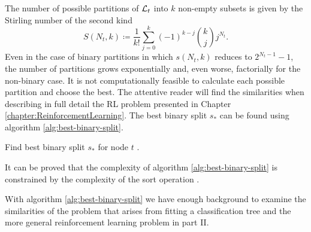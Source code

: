 The number of possible partitions of $\mathcal{L}_t$ into $k$ non-empty subsets is given by the Stirling number of the second kind \cite{louppe2014}
\begin{equation*}
    S(N_t, k) \coloneqq \frac{1}{k!} \sum_{j=0}^{k} (-1)^{k-j} \binom{k}{j} j^{N_t}.
\end{equation*}
Even in the case of binary partitions in which $s(N_t, k)$ reduces to $2^{N_t
-1}-1$, the number of partitions grows exponentially and, even worse,
factorially for the non-binary case. It is not computationally feasible to
calculate each possible partition and choose the best. The attentive reader will
find the similarities when describing in full detail the RL problem presented in
Chapter \ref{chapter:ReinforcementLearning}. The best binary split $s_*$ can be found using algorithm \ref{alg:best-binary-split}.

\begin{algorithm}
    \caption{Find best binary split $s_*$ for node $t$ \cite[Ch.~3.6.3]{louppe2014}.}
    \label{alg:best-binary-split}
\end{algorithm}

It can be proved that the complexity of algorithm \ref{alg:best-binary-split} is
constrained by the complexity of the sort operation \cite[Ch.~5]{louppe2014}.

With algorithm \ref{alg:best-binary-split} we have enough background to examine the similarities of the problem that arises from fitting a classification tree and the more general reinforcement learning problem in part II.


